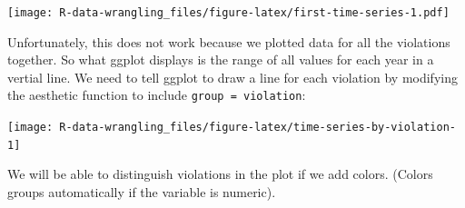 \documentclass[]{book}
\newenvironment{Shaded}{\begin{snugshade}}{\end{snugshade}}
\newcommand{\KeywordTok}[1]{\textcolor[rgb]{0.13,0.29,0.53}{\textbf{#1}}}
\newcommand{\DataTypeTok}[1]{\textcolor[rgb]{0.13,0.29,0.53}{#1}}
\newcommand{\StringTok}[1]{\textcolor[rgb]{0.31,0.60,0.02}{#1}}
\newcommand{\OtherTok}[1]{\textcolor[rgb]{0.56,0.35,0.01}{#1}}
\newcommand{\OperatorTok}[1]{\textcolor[rgb]{0.81,0.36,0.00}{\textbf{#1}}}
\newcommand{\NormalTok}[1]{#1}
\theoremstyle{definition}
\theoremstyle{definition}
\theoremstyle{definition}
\theoremstyle{remark}
\begin{document}
\texttt{[image: R-data-wrangling\_files/figure-latex/first-time-series-1.pdf]}

Unfortunately, this does not work because we plotted data for all the
violations together. So what ggplot displays is the range of all values
for each year in a vertial line. We need to tell ggplot to draw a line
for each violation by modifying the aesthetic function to include
\texttt{group\ =\ violation}:

\begin{Shaded}
\end{Shaded}

\texttt{[image: R-data-wrangling\_files/figure-latex/time-series-by-violation-1]}

We will be able to distinguish violations in the plot if we add colors.
(Colors groups automatically if the variable is numeric).

\begin{Shaded}
\end{Shaded}
\end{document}
